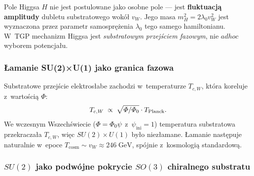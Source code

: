 \begin{remark}%
\label{rem:higgs-substrate}
Pole Higgsa $H$ nie jest postulowane jako osobne pole ---
jest \textbf{fluktuacją amplitudy} dubletu substratowego
wokół $v_W$. Jego masa $m_H^2 = 2\lambda_0 v_W^2$
jest wyznaczona przez parametr samosprężenia $\lambda_0$
tego samego hamiltonianu. W~TGP mechanizm Higgsa
jest \emph{substratowym przejściem fazowym}, nie $ad hoc$
wyborem potencjału.
\end{remark}

\subsubsection{Łamanie SU(2)×U(1) jako granica fazowa}

\begin{proposition}\label{prop:EW-phase}
Substratowe przejście elektrosłabe zachodzi w~temperaturze $T_{c,W}$,
która koreluje z~wartością $\Phi$:
\begin{equation}\label{eq:EW-Phi-corr}
    T_{c,W} \;\propto\; \sqrt{\varPhi / \varPhi_0} \cdot T_{\mathrm{Planck}}.
\end{equation}
We wczesnym Wszechświecie ($\varPhi = \varPhi_0\psi$ z~$\psi_{\mathrm{ini}} = 1$)
temperatura substratowa przekraczała $T_{c,W}$, więc $SU(2) \times U(1)$
było niezłamane. Łamanie następuje naturalnie w~epoce
$T_{\mathrm{cosm}} \sim v_W \approx 246\;\mathrm{GeV}$,
spójnie z~kosmologią standardową.
\end{proposition}

\subsubsection{$SU(2)$ jako podw\'ojne pokrycie $SO(3)$
  chiralnego substratu}\label{sssec:su2-chiral}

